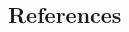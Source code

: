 \documentclass[final]{beamer}\usepackage{graphicx, color}
\begin{document}
\begin{frame}[fragile]
\begin{multicols}{2}


\section{References}
\renewcommand{\bibname}{\chapter{References}}
\let\oldbibsection\bibsection
\renewcommand{\bibsection}{}





\end{multicols}

\end{frame}
\end{document}
